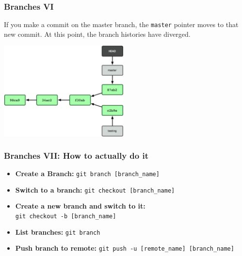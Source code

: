 \documentclass{beeper}
\begin{document}
\begin{frame}
    \frametitle{Branches VI}
    If you make a commit on the master branch, the \texttt{master} pointer moves
    to that new commit.  At this point, the branch histories have diverged.

    \begin{center}
        \includegraphics[width=65mm]{graphics/branching5.png}
    \end{center}
\end{frame}

\begin{frame}
    \frametitle{Branches VII: How to actually do it}

    \begin{itemize}
        \item \textbf{Create a Branch:} \texttt{git branch [branch\_name]}
        \item \textbf{Switch to a branch:} \texttt{git checkout [branch\_name]}
        \item \textbf{Create a new branch and switch to it:}\\ \texttt{git checkout -b [branch\_name]}
        \item \textbf{List branches:} \texttt{git branch}
        \item \textbf{Push branch to remote:} \texttt{git push -u [remote\_name] [branch\_name]}
    \end{itemize}
\end{frame}
\end{document}
